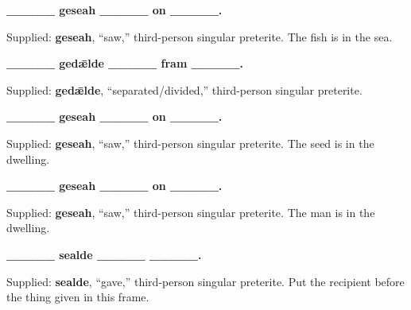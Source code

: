 \textbf{\_\_\_\_\_ geseah \_\_\_\_\_ on \_\_\_\_\_.}\par\nobreak

Supplied: \textbf{geseah}, “saw,” third-person singular preterite. The fish is in the sea.


\textbf{\_\_\_\_\_ gedǣlde \_\_\_\_\_ fram \_\_\_\_\_.}\par\nobreak

Supplied: \textbf{gedǣlde}, “separated/\allowbreak{}divided,” third-person singular preterite.


\textbf{\_\_\_\_\_ geseah \_\_\_\_\_ on \_\_\_\_\_.}\par\nobreak

Supplied: \textbf{geseah}, “saw,” third-person singular preterite. The seed is in the dwelling.


\textbf{\_\_\_\_\_ geseah \_\_\_\_\_ on \_\_\_\_\_.}\par\nobreak

Supplied: \textbf{geseah}, “saw,” third-person singular preterite. The man is in the dwelling.


\textbf{\_\_\_\_\_ sealde \_\_\_\_\_ \_\_\_\_\_.}\par\nobreak

Supplied: \textbf{sealde}, “gave,” third-person singular preterite. Put the recipient before the thing given in this frame.


